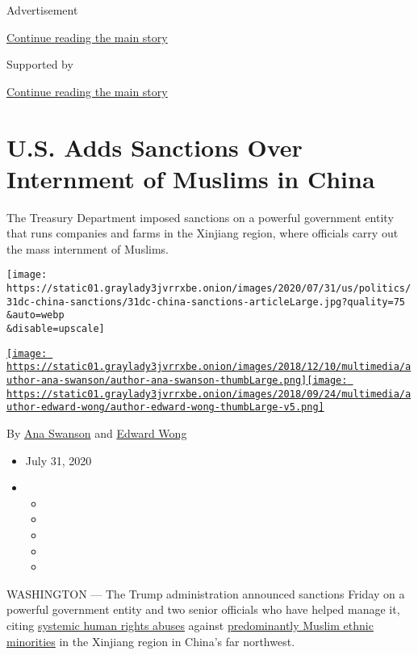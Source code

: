 Advertisement

\protect\hyperlink{after-top}{Continue reading the main story}

Supported by

\protect\hyperlink{after-sponsor}{Continue reading the main story}

\hypertarget{us-adds-sanctions-over-internment-of-muslims-in-china}{%
\section{U.S. Adds Sanctions Over Internment of Muslims in
China}\label{us-adds-sanctions-over-internment-of-muslims-in-china}}

The Treasury Department imposed sanctions on a powerful government
entity that runs companies and farms in the Xinjiang region, where
officials carry out the mass internment of Muslims.

\texttt{[image: https://static01.graylady3jvrrxbe.onion/images/2020/07/31/us/politics/31dc-china-sanctions/31dc-china-sanctions-articleLarge.jpg?quality=75\\\&auto=webp\\\&disable=upscale]}

\href{https://www.nytimes3xbfgragh.onion/by/ana-swanson}{\texttt{[image: https://static01.graylady3jvrrxbe.onion/images/2018/12/10/multimedia/author-ana-swanson/author-ana-swanson-thumbLarge.png]}}\href{https://www.nytimes3xbfgragh.onion/by/edward-wong}{\texttt{[image: https://static01.graylady3jvrrxbe.onion/images/2018/09/24/multimedia/author-edward-wong/author-edward-wong-thumbLarge-v5.png]}}

By \href{https://www.nytimes3xbfgragh.onion/by/ana-swanson}{Ana Swanson}
and \href{https://www.nytimes3xbfgragh.onion/by/edward-wong}{Edward
Wong}

\begin{itemize}
\item
  July 31, 2020
\item
  \begin{itemize}
  \item
  \item
  \item
  \item
  \item
  \end{itemize}
\end{itemize}

WASHINGTON --- The Trump administration announced sanctions Friday on a
powerful government entity and two senior officials who have helped
manage it, citing
\href{https://www.nytimes3xbfgragh.onion/2020/05/09/us/politics/china-uighurs-arrest.html}{systemic
human rights abuses} against
\href{https://www.nytimes3xbfgragh.onion/2018/10/18/world/asia/uighur-muslims-china-detainment.html}{predominantly
Muslim ethnic minorities} in the Xinjiang region in China's far
northwest.

